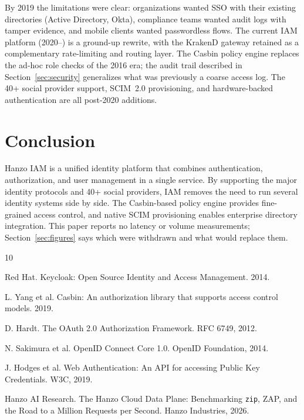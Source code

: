 \documentclass[11pt,twocolumn]{article}
\begin{document}
By 2019 the limitations were clear: organizations wanted SSO with their existing directories (Active Directory, Okta), compliance teams wanted audit logs with tamper evidence, and mobile clients wanted passwordless flows. The current IAM platform (2020--) is a ground-up rewrite, with the KrakenD gateway retained as a complementary rate-limiting and routing layer. The Casbin policy engine replaces the ad-hoc role checks of the 2016 era; the audit trail described in Section~\ref{sec:security} generalizes what was previously a coarse access log. The 40+ social provider support, SCIM~2.0 provisioning, and hardware-backed authentication are all post-2020 additions.

\section{Conclusion}

Hanzo IAM is a unified identity platform that combines authentication, authorization, and user management in a single service. By supporting the major identity protocols and 40+ social providers, IAM removes the need to run several identity systems side by side. The Casbin-based policy engine provides fine-grained access control, and native SCIM provisioning enables enterprise directory integration. This paper reports no latency or volume measurements; Section~\ref{sec:figures} says which were withdrawn and what would replace them.


\begin{thebibliography}{10}

Red Hat. Keycloak: Open Source Identity and Access Management. 2014.

L. Yang et al. Casbin: An authorization library that supports access control models. 2019.

D. Hardt. The OAuth 2.0 Authorization Framework. RFC 6749, 2012.

N. Sakimura et al. OpenID Connect Core 1.0. OpenID Foundation, 2014.

J. Hodges et al. Web Authentication: An API for accessing Public Key Credentials. W3C, 2019.

Hanzo AI Research. The Hanzo Cloud Data Plane: Benchmarking \texttt{zip}, ZAP, and the Road to a Million Requests per Second. Hanzo Industries, 2026.

\end{thebibliography}
\end{document}
